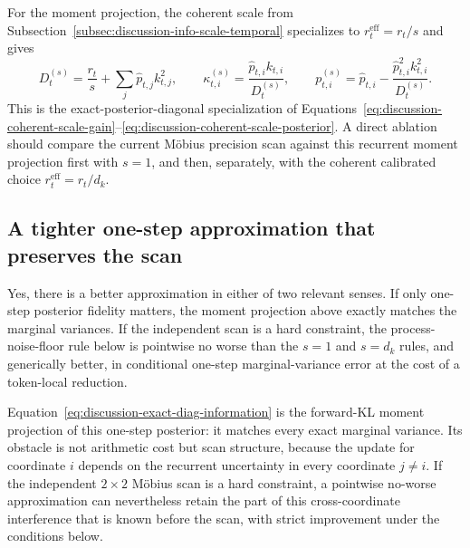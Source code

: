 \documentclass[11pt]{article}
\begin{document}
For the moment projection, the coherent scale from
Subsection~\ref{subsec:discussion-info-scale-temporal} specializes to
$r_t^{\mathrm{eff}}=r_t/s$ and gives
\begin{equation}
  D_t^{(s)}
  = \frac{r_t}{s}+\sum_j\widehat p_{t,j}k_{t,j}^2,
  \qquad
  \kappa_{t,i}^{(s)}
  = \frac{\widehat p_{t,i}k_{t,i}}{D_t^{(s)}},
  \qquad
  p_{t,i}^{(s)}
  = \widehat p_{t,i}
    -\frac{\widehat p_{t,i}^2k_{t,i}^2}{D_t^{(s)}}.
  \label{eq:discussion-exact-diag-scaled}
\end{equation}
This is the exact-posterior-diagonal specialization of
Equations~\eqref{eq:discussion-coherent-scale-gain}--\eqref{eq:discussion-coherent-scale-posterior}.
A direct ablation should compare the current M\"obius precision scan against this recurrent moment
projection first with $s=1$, and then, separately, with the coherent calibrated choice
$r_t^{\mathrm{eff}}=r_t/d_k$.

\subsection{A tighter one-step approximation that preserves the scan}
\label{subsec:discussion-process-floor-approximation}

Yes, there is a better approximation in either of two relevant senses. If only one-step posterior
fidelity matters, the moment projection above exactly matches the marginal variances. If the
independent scan is a hard constraint, the process-noise-floor rule below is pointwise no worse
than the $s=1$ and $s=d_k$ rules, and generically better, in conditional one-step
marginal-variance error at the cost of a token-local reduction.

Equation~\eqref{eq:discussion-exact-diag-information} is the forward-KL moment projection of this
one-step posterior: it matches every exact marginal variance. Its obstacle is not arithmetic cost
but scan structure, because the update for coordinate $i$ depends on the recurrent uncertainty in
every coordinate $j\ne i$. If the independent $2\times2$ M\"obius scan is a hard constraint, a
pointwise no-worse approximation can nevertheless retain the part of this cross-coordinate
interference that is known before the scan, with strict improvement under the conditions below.
\end{document}
